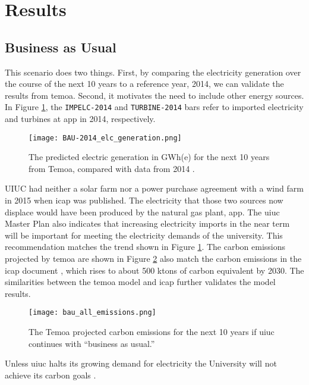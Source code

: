 \section{Results}

\subsection{Business as Usual}

This scenario does two things. First, by comparing the electricity generation
over the course of the next 10 years to a reference year, 2014, we can validate
the results from \gls{temoa}. Second, it motivates the need to include other
energy sources.
In Figure \ref{fig:bau-2014}, the \texttt{IMPELC-2014}
and \texttt{TURBINE-2014} bars refer to imported electricity and turbines
at \gls{app} in 2014, respectively.

\begin{figure}[ht]
	\centering
	\texttt{[image: BAU-2014\_elc\_generation.png]}
	\caption{The predicted electric generation in GWh(e) for the next 10 years
	from Temoa, compared with data from 2014 \cite{isee_illinois_2015}.}
	\label{fig:bau-2014}
\end{figure}

UIUC had neither a solar farm nor a power purchase agreement with a wind farm
in 2015 when \gls{icap} was published.
The electricity that those two sources now displace would have been produced by
the natural gas plant, \gls{app}.
The \gls{uiuc} Master Plan \cite{affiliated_engineers_inc_utilities_2015}
also indicates that increasing electricity imports in the near term will be
important for meeting the electricity demands of the university. This
recommendation matches the trend shown in Figure \ref{fig:bau-2014}.
The carbon emissions projected by \gls{temoa} are shown in Figure \ref{fig:bau-emissions}
also match the carbon emissions in the \gls{icap} document
\cite{isee_illinois_2015}, which rises to about 500
ktons of carbon equivalent by 2030. The similarities between the \gls{temoa}
model and \gls{icap} further validates the model results.

\begin{figure}[ht]
	\centering
	\texttt{[image: bau\_all\_emissions.png]}
	\caption{The Temoa projected carbon emissions for the next 10 years if
	\gls{uiuc} continues with ``business as usual.''}
	\label{fig:bau-emissions}
\end{figure}

Unless \gls{uiuc} halts its growing demand for electricity the University will
not achieve its carbon goals \cite{isee_illinois_2015, affiliated_engineers_inc_utilities_2015}.


